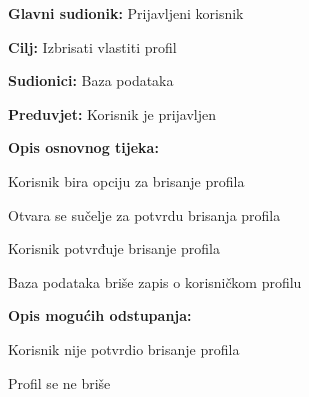 \noindent {}
\begin{packed_item}

\item \textbf{Glavni sudionik:} Prijavljeni korisnik
\item  \textbf{Cilj:} Izbrisati vlastiti profil
\item  \textbf{Sudionici:} Baza podataka
\item  \textbf{Preduvjet:} Korisnik je prijavljen
\item  \textbf{Opis osnovnog tijeka:}

\item[] \begin{packed_enum}

    \item Korisnik bira opciju za brisanje profila
    \item Otvara se sučelje za potvrdu brisanja profila
    \item Korisnik potvrđuje brisanje profila
    \item Baza podataka briše zapis o korisničkom profilu

\end{packed_enum}

\item  \textbf{Opis mogućih odstupanja:}

\item[] \begin{packed_item}

    \item[3.a] Korisnik nije potvrdio brisanje profila
    \item[] \begin{packed_enum}

        \item Profil se ne briše

    \end{packed_enum}

\end{packed_item}
\end{packed_item}

